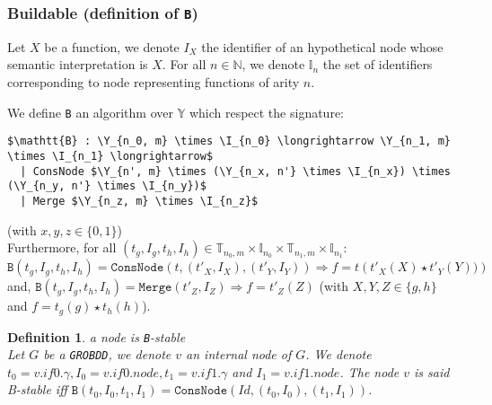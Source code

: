 \documentclass[a4paper,10pt]{article}
\newcommand{\N}{\mathbb{N}}%
\newcommand{\Y}{\mathbb{Y}}
\newcommand{\I}{\mathbb{I}}
\newcommand{\T}{\mathbb{T}}
\newcommand{\GroBdd}{\texttt{GROBDD}}
\newtheorem{newdef}{Definition}
\newcommand{\definition}[2]{\begin{newdef}{#1\\}#2\end{newdef}}
\begin{document}
\subsubsection{Buildable (definition of \texttt{B})}

Let $X$ be a function, we denote $I_X$ the identifier of an hypothetical node whose semantic interpretation is $X$.
For all $n\in\N$, we denote $\I_n$ the set of identifiers corresponding to node representing functions of arity $n$.

We define \texttt{B} an algorithm over $\Y$ which respect the signature:
\begin{lstlisting}
$\mathtt{B} : \Y_{n_0, m} \times \I_{n_0} \longrightarrow \Y_{n_1, m} \times \I_{n_1} \longrightarrow$
  | ConsNode $\Y_{n', m} \times (\Y_{n_x, n'} \times \I_{n_x}) \times (\Y_{n_y, n'} \times \I_{n_y})$
  | Merge $\Y_{n_z, m} \times \I_{n_z}$
\end{lstlisting}
(with $x, y, z \in \{0, 1\}$) \\
Furthermore, for all $(t_g, I_g, t_h, I_h) \in \T_{n_0, m} \times \I_{n_0} \times \T_{n_1, m} \times \I_{n_1}$:
$\texttt{B}(t_g, I_g, t_h, I_h) = \texttt{ConsNode} (t, (t'_X, I_X), (t'_Y, I_Y)) \Rightarrow f = t\left(t'_X(X) \star t'_Y(Y))\right)$
and, $\texttt{B}(t_g, I_g, t_h, I_h) = \texttt{Merge} (t'_Z, I_Z) \Rightarrow f = t'_Z(Z)$ (with $X, Y, Z \in\{g, h\}$ and $f = t_g(g) \star t_h(h)$).

\definition{a node is \texttt{B}-stable}
{
Let $G$ be a \GroBdd{}, we denote $v$ an internal node of $G$.
We denote $t_0 = v.if0.\gamma, I_0 = v.if0.node, t_1 = v.if1.\gamma$ and $I_1 = v.if1.node$.
The node $v$ is said B-stable iff $\mathtt{B}(t_0, I_0, t_1, I_1) = \mathtt{ConsNode}(Id, (t_0, I_0), (t_1, I_1))$.
}
\end{document}
